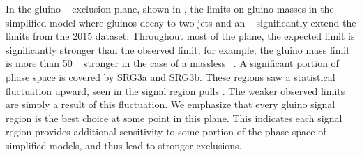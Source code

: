 In the gluino-\lsp~ exclusion plane, shown in , the limits on gluino masses in the simplified model where gluinos decay to two jets and an \lsp~ significantly extend the limits from the 2015 dataset.
Throughout most of the plane, the expected limit is significantly stronger than the observed limit; for example, the gluino mass limit is more than 50 \GeV~ stronger in the case of a massless \lsp~.
A significant portion of phase space is covered by SRG3a and SRG3b.
These regions saw a statistical fluctuation upward, seen in the signal region pulls .
The weaker observed limits are simply a result of this fluctuation.
We emphasize that every gluino signal region is the best choice at some point in this plane.
This indicates each signal region provides additional sensitivity to some portion of the phase space of simplified models, and thus lead to stronger exclusions.

